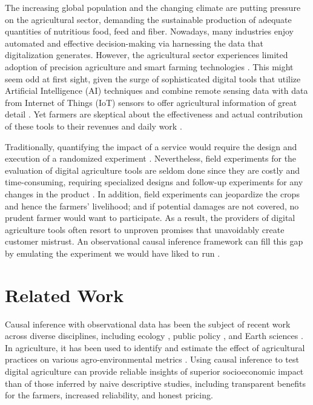 \documentclass[letterpaper]{article} %
\begin{document}
The increasing global population and the changing climate are putting pressure on the agricultural sector, demanding the sustainable production of adequate quantities of nutritious food, feed and fiber. Nowadays, many industries enjoy automated and effective decision-making via harnessing the data that digitalization generates. However, the agricultural sector experiences limited adoption of precision agriculture and smart farming technologies \cite{gabriel2022adoption}. This might seem odd at first sight, given the surge of sophisticated digital tools that utilize Artificial Intelligence (AI) techniques and combine remote sensing data with data from Internet of Things (IoT) sensors to offer agricultural information of great detail \cite{sharma2020machine, nanushi2022pest, choumos2022towards}.
Yet farmers are skeptical about the effectiveness and actual contribution of these tools to their revenues and daily work \cite{lowenberg2019setting, lioutas2021digitalization}.

Traditionally, quantifying the impact of a service would require the design and execution of a randomized experiment \cite{boruch1997randomized}. Nevertheless, field experiments for the evaluation of digital agriculture tools are seldom done since they are costly and time-consuming, requiring specialized designs and follow-up experiments for any changes in the product \cite{vaessen2010challenges, diggleexperimental}. In addition, field experiments can jeopardize the crops and hence the farmers' livelihood; and if potential damages are not covered, no prudent farmer would want to participate. As a result, the providers of digital agriculture tools often resort to unproven promises that unavoidably create customer mistrust. An observational causal inference framework \cite{pearl2009causality} can fill this gap by emulating the experiment we would have liked to run \cite{hernan2016using}.

\section{Related Work}

Causal inference with observational data has been the subject of recent work across diverse disciplines, including
ecology \cite{arif2022utilizing}, public policy \cite{fougere2019causal}, and Earth sciences
\cite{massmann2021causal, runge2019inferring}. In agriculture, it has been used to identify and estimate the effect of agricultural practices on various agro-environmental metrics \cite{qian2016applying, deines2019satellites, giannarakis2022personalizing, giannarakis2022towards}.
Using causal inference to test digital agriculture can provide reliable insights of superior socioeconomic impact than of those inferred by naive descriptive studies, including transparent benefits for the farmers, increased reliability, and honest pricing.
\end{document}

